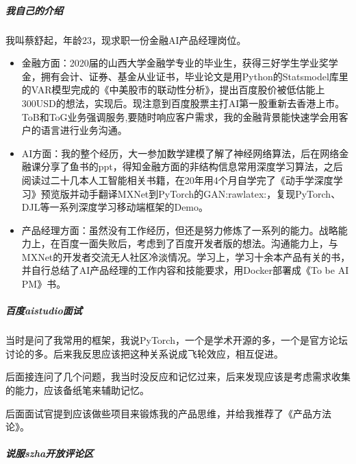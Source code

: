\documentclass[letterpaper,10pt,english]{sphinxmanual}
\begin{document}
\subparagraph{我自己的介绍}
\label{\detokenize{chapter_interview/simulate_interview:id5}}
我叫蔡舒起，年龄23，现求职一份金融AI产品经理岗位。
\begin{itemize}
\item {} 
金融方面：2020届的山西大学金融学专业的毕业生，获得三好学生学业奖学金，拥有会计、证券、基金从业证书，毕业论文是用Python的Statsmodel库里的VAR模型完成的《中美股市的联动性分析》，提出百度股价被低估能上300USD的想法，实现后。现注意到百度股票主打AI第一股重新去香港上市。ToB和ToG业务强调服务,要随时响应客户需求，我的金融背景能快速学会用客户的语言进行业务沟通。%
\begin{footnote}[877]\sphinxAtStartFootnote
{}
%
\end{footnote}

\item {} 
AI方面：我的整个经历，大一参加数学建模了解了神经网络算法，后在网络金融课分享了鱼书的ppt，得知金融方面的非结构信息常用深度学习算法，之后阅读过二十几本人工智能相关书籍，在20年用4个月自学完了《动手学深度学习》预览版并动手翻译MXNet到PyTorch的GAN:raw\sphinxhyphen{}latex:，复现PyTorch、DJL等一系列深度学习移动端框架的Demo。

\item {} 
产品经理方面：虽然没有工作经历，但还是努力修炼了一系列的能力。战略能力上，在百度一面失败后，考虑到了百度开发者版的想法。沟通能力上，与MXNet的开发者交流无人社区冷淡情况。学习上，学习十余本产品有关的书，并自行总结了AI产品经理的工作内容和技能要求，用Docker部署成《To
be AI PM》书。

\end{itemize}


\subparagraph{百度aistudio面试}
\label{\detokenize{chapter_interview/simulate_interview:aistudio}}
当时是问了我常用的框架，我说PyTorch，一个是学术开源的多，一个是官方论坛讨论的多。后来我反思应该把这种关系说成飞轮效应，相互促进。

后面接连问了几个问题，我当时没反应和记忆过来，后来发现应该是考虑需求收集的能力，应该备纸笔来辅助记忆。

后面面试官提到应该做些项目来锻炼我的产品思维，并给我推荐了《产品方法论》。



\subparagraph{说服szha开放评论区}
\label{\detokenize{chapter_interview/simulate_interview:szha}}
\end{document}
